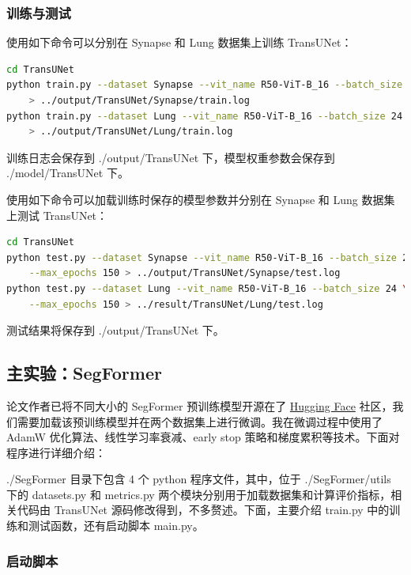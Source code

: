 \documentclass[hyperref,a4paper,UTF8]{ctexart}
\begin{document}
\subsubsection{训练与测试}

使用如下命令可以分别在 Synapse 和 Lung 数据集上训练 TransUNet：

\begin{lstlisting}[language=bash]
cd TransUNet
python train.py --dataset Synapse --vit_name R50-ViT-B_16 --batch_size 22 \
    > ../output/TransUNet/Synapse/train.log
python train.py --dataset Lung --vit_name R50-ViT-B_16 --batch_size 24 \
    > ../output/TransUNet/Lung/train.log
\end{lstlisting}

训练日志会保存到 ./output/TransUNet 下，模型权重参数会保存到 ./model/TransUNet 下。

使用如下命令可以加载训练时保存的模型参数并分别在 Synapse 和 Lung 数据集上测试 TransUNet：

\begin{lstlisting}[language=bash]
cd TransUNet
python test.py --dataset Synapse --vit_name R50-ViT-B_16 --batch_size 22 \
    --max_epochs 150 > ../output/TransUNet/Synapse/test.log
python test.py --dataset Lung --vit_name R50-ViT-B_16 --batch_size 24 \
    --max_epochs 150 > ../result/TransUNet/Lung/test.log
\end{lstlisting}

测试结果将保存到 ./output/TransUNet 下。

\subsection{主实验：SegFormer}

论文作者已将不同大小的 SegFormer 预训练模型开源在了 \href{https://huggingface.co/}{Hugging Face} 社区，我们需要加载该预训练模型并在两个数据集上进行微调。我在微调过程中使用了 AdamW 优化算法、线性学习率衰减、early stop 策略和梯度累积等技术。下面对程序进行详细介绍：

./SegFormer 目录下包含 4 个 python 程序文件，其中，位于 ./SegFormer/utils 下的 datasets.py 和 metrics.py 两个模块分别用于加载数据集和计算评价指标，相关代码由 TransUNet 源码修改得到，不多赘述。下面，主要介绍 train.py 中的训练和测试函数，还有启动脚本 main.py。

\subsubsection{启动脚本}
\end{document}
